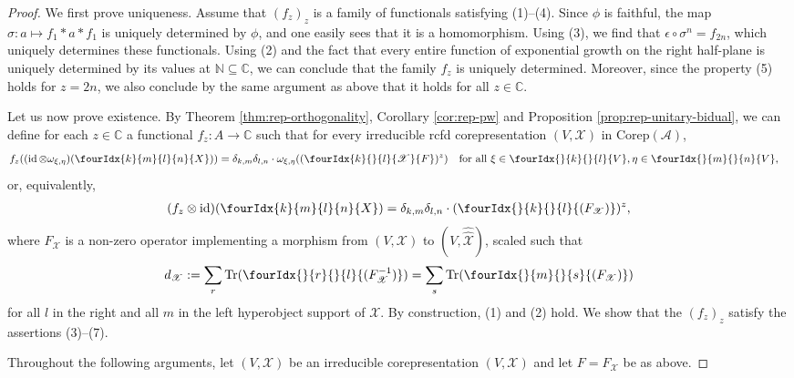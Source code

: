 \documentclass[10pt]{article}
\DeclareMathOperator{\id}{id}
\newcommand{\dualco}[1]{\hat{#1}}
\newcommand{\Corep}{\mathrm{Corep}}
\newcommand{\C}{\mathbb{C}}
\newcommand{\N}{\mathbb{N}}
\newcommand{\Tr}{\mathrm{Tr}}
\newcommand{\Gr}[5]{\fourIdx{#2}{#4}{#3}{#5}{#1}}%
\newcommand{\Gru}[3]{\Gr{#1}{}{}{#2}{#3}}
\theoremstyle{definition}
\numberwithin{equation}{section}
\begin{document}
\begin{proof}
  We first prove uniqueness.  Assume that $(f_{z})_{z}$ is a family of
  functionals satisfying (1)--(4).  Since $\phi$ is faithful, the map
  $\sigma\colon a \mapsto f_{1} \ast a \ast f_{1}$ is uniquely
  determined by $\phi$, and one easily sees that it is a homomorphism. Using
  (3), we find that $\epsilon \circ \sigma^n=f_{2n}$, which uniquely determines these functionals. Using (2) and the
  fact that every entire function of exponential growth on the right
  half-plane is uniquely determined by its values at $\N \subseteq \C$, we can conclude that the family $f_{z}$ is uniquely determined. Moreover, since the property (5) holds for $z = 2n$, we also conclude by the same argument as above that it holds for all $z\in \C$.

  Let us now prove existence.  By Theorem \ref{thm:rep-orthogonality}, Corollary \ref{cor:rep-pw} and Proposition \ref{prop:rep-unitary-bidual}, we can
  define for each $z\in \C$ a functional $f_{z} \colon A \to \C$ such
  that for every 
  irreducible rcfd corepresentation
  $(V,\mathscr{X})$ in $\Corep(\mathscr{A})$,
    \begin{align*}
      f_{z}((\id \otimes \omega_{\xi,\eta})(\Gr{X}{k}{l}{m}{n})) &=
      \delta_{k,m}\delta_{l,n} \cdot
      \omega_{\xi,\eta}((\Gr{F}{k}{l}{}{\mathscr{X}})^{z}) \quad \text{for all }
      \xi \in \Gru{V}{k}{l},\eta \in
      \Gru{V}{m}{n},
    \end{align*}
    or, equivalently,
    \begin{align*}
      (f_{z} \otimes \id)(\Gr{X}{k}{l}{m}{n}) =
      \delta_{k,m}\delta_{l,n} \cdot (\Gru{(F_{\mathscr{X}})}{k}{l})^{z},
    \end{align*}
    where $F_{\mathscr{X}}$ is a non-zero operator implementing a morphism from $(V,\mathscr{X})$ to
    $(V, \dualco{\dualco{\mathscr{X}}})$, scaled such that
    \begin{align*}
      d_{\mathscr{X}}:= \sum_{r} \Tr(\Gru{(F_{\mathscr{X}}^{-1})}{r}{l}) = \sum_{s}
      \Tr(\Gru{(F_{\mathscr{X}})}{m}{s})
    \end{align*}
    for all $l$ in the right and all $m$ in the left hyperobject support of $\mathscr{X}$. By
    construction, (1) and (2) hold. We show that the $(f_{z})_{z}$ satisfy the
    assertions (3)--(7). 

        Throughout the following arguments, let 
    $(V,\mathscr{X})$ be an  irreducible corepresentation
    $(V,\mathscr{X})$ and let $F=F_{\mathscr{X}}$ be as above.


\end{proof}
\end{document}
